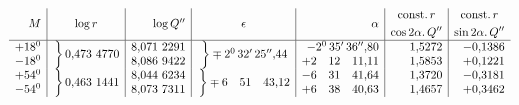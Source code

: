 \[
\begin{array}{r|c|r|c|r|r|r}
M&\log r&\log Q''&\epsilon&\alpha&\begin{gathered}\mathrm{const.}\,r\\\cos2\alpha.\,Q''\end{gathered}&\begin{gathered}\mathrm{const.}\,r\\\sin2\alpha.\,Q''\end{gathered}\\\hline
\begin{array}{@{}r@{}}+18^{0}\\-18^{0}\end{array}&\left.\vphantom{\begin{array}{c}0\\0\end{array}}\right\}0{,}473\ 4770&\begin{array}{@{}r@{}}8{,}071\ 2291\\8{,}086\ 9422\end{array}&\left.\vphantom{\begin{array}{c}0\\0\end{array}}\right\}\mp2^{0}\,32'\,25''{,}44&\begin{array}{@{}r@{}}-2^{0}\,35'\,36''{,}80\\+2\quad12\quad11{,}11\end{array}&\begin{array}{@{}r@{}}1{,}5272\\1{,}5853\end{array}&\begin{array}{@{}r@{}}-0{,}1386\\+0{,}1221\end{array}\\[3pt]
\begin{array}{@{}r@{}}+54^{0}\\-54^{0}\end{array}&\left.\vphantom{\begin{array}{c}0\\0\end{array}}\right\}0{,}463\ 1441&\begin{array}{@{}r@{}}8{,}044\ 6234\\8{,}073\ 7311\end{array}&\left.\vphantom{\begin{array}{c}0\\0\end{array}}\right\}\mp6\quad51\quad43{,}12&\begin{array}{@{}r@{}}-6\quad31\quad41{,}64\\+6\quad38\quad40{,}63\end{array}&\begin{array}{@{}r@{}}1{,}3720\\1{,}4657\end{array}&\begin{array}{@{}r@{}}-0{,}3181\\+0{,}3462\end{array}\\[3pt]

\end{array}\]

